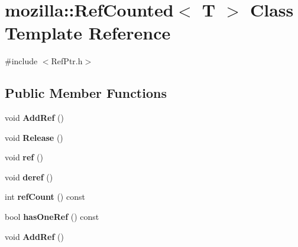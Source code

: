 \hypertarget{classmozilla_1_1_ref_counted}{\section{mozilla\-:\-:Ref\-Counted$<$ T $>$ Class Template Reference}
\label{classmozilla_1_1_ref_counted}
}


{\ttfamily \#include $<$Ref\-Ptr.\-h$>$}

\subsection*{Public Member Functions}
\begin{DoxyCompactItemize}
\item 
\hypertarget{classmozilla_1_1_ref_counted_a444e9df3b99af750fab076d1df5b47a1}{void {\bfseries Add\-Ref} ()}\label{classmozilla_1_1_ref_counted_a444e9df3b99af750fab076d1df5b47a1}

\item 
\hypertarget{classmozilla_1_1_ref_counted_a72161179fb2466d80a8d927937a657be}{void {\bfseries Release} ()}\label{classmozilla_1_1_ref_counted_a72161179fb2466d80a8d927937a657be}

\item 
\hypertarget{classmozilla_1_1_ref_counted_a623ce25a4229da8434f7bd0e174fae8a}{void {\bfseries ref} ()}\label{classmozilla_1_1_ref_counted_a623ce25a4229da8434f7bd0e174fae8a}

\item 
\hypertarget{classmozilla_1_1_ref_counted_a57886d761389c3bda9285152e5c4954f}{void {\bfseries deref} ()}\label{classmozilla_1_1_ref_counted_a57886d761389c3bda9285152e5c4954f}

\item 
\hypertarget{classmozilla_1_1_ref_counted_a13c4f80e6b52b258a881f80e0f1c00a8}{int {\bfseries ref\-Count} () const }\label{classmozilla_1_1_ref_counted_a13c4f80e6b52b258a881f80e0f1c00a8}

\item 
\hypertarget{classmozilla_1_1_ref_counted_a799f1672c12deca68abb32b75c7f7793}{bool {\bfseries has\-One\-Ref} () const }\label{classmozilla_1_1_ref_counted_a799f1672c12deca68abb32b75c7f7793}

\item 
\hypertarget{classmozilla_1_1_ref_counted_a444e9df3b99af750fab076d1df5b47a1}{void {\bfseries Add\-Ref} ()}\label{classmozilla_1_1_ref_counted_a444e9df3b99af750fab076d1df5b47a1}


\end{DoxyCompactItemize}
